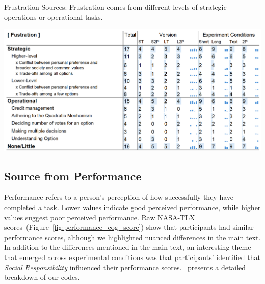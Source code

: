 \begin{table}[p]
    \caption{Frustration Sources: Frustration comes from different levels of strategic operations or operational tasks.}

    \label{tbl:fustration}
    \includegraphics[width=0.85\linewidth]{content/image/cog/fustration_table.png}
\end{table}

\subsection{Source from Performance}
\label{apdx:performance}

Performance refers to a person's perception of how successfully they have completed a task. Lower values indicate good perceived performance, while higher values suggest poor perceived performance. Raw NASA-TLX scores~(Figure~\ref{fig:performance_cog_score}) show that participants had similar performance scores, although we highlighted nuanced differences in the main text. In addition to the differences mentioned in the main text, an interesting theme that emerged across experimental conditions was that participants' identified that \textit{Social Responsibility} influenced their performance scores.~ presents a detailed breakdown of our codes.

